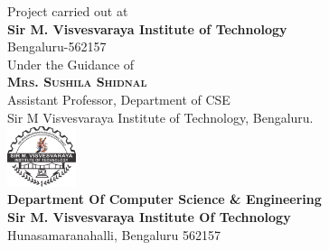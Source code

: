 \begin{titlepage}
	\large{Project carried out at\\
		\textbf{Sir M. Visvesvaraya Institute of Technology}
		\\Bengaluru-562157
	}\\[10pt]
	\large{Under the Guidance of\\
		\textbf{\textsc{\large Mrs. Sushila Shidnal }}\\
		Assistant Professor, Department of CSE\\
		Sir M Visvesvaraya Institute of Technology, Bengaluru.
	}\\[10pt]
	\includegraphics[width=0.15\textwidth]{images/mvit.png}\\[10pt] 
	\large{
		\textbf{Department Of Computer Science \& Engineering}\\
		\textbf{Sir M. Visvesvaraya Institute Of Technology}\\
		Hunasamaranahalli, Bengaluru 562157\\
	}

\end{titlepage}

